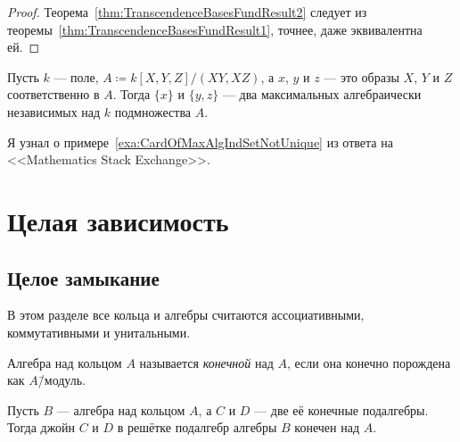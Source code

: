 \documentclass[
	extrafontsizes,
	11pt,
	hyphens,
]{memoir}
\begin{document}
\begin{proof}
Теорема~\ref{thm:TranscendenceBasesFundResult2} следует из теоремы~\ref{thm:TranscendenceBasesFundResult1}, точнее, даже эквивалентна ей.
\end{proof}

\begin{example}
Пусть \(k\) --- поле, \(A \coloneqq k[X, Y, Z]/(XY, XZ)\), а \(x\), \(y\) и \(z\) --- это образы \(X\), \(Y\) и \(Z\) соответственно в \(A\).%
\label{exa:CardOfMaxAlgIndSetNotUnique}
Тогда \(\{x\}\) и \(\{y, z\}\) --- два максимальных алгебраически независимых над \(k\) подмножества \(A\).
\end{example}

\begin{remark}
Я узнал о примере~\ref{exa:CardOfMaxAlgIndSetNotUnique} из ответа \cite{ms942910} на <<\textenglish{Mathematics Stack Exchange}>>.
\end{remark}



\chapter{Целая зависимость}


\section{Целое замыкание}

\begin{convention}
В этом разделе все кольца и алгебры считаются ассоциативными, коммутативными и унитальными.
\end{convention}


\begin{definition}
Алгебра над кольцом \(A\) называется \emph{конечной} над \(A\), если она конечно порождена как \(A\)\=/модуль.
\end{definition}

\begin{theorem}
Пусть \(B\) --- алгебра над кольцом \(A\), а \(C\) и \(D\) --- две её конечные подалгебры.%
\label{thm:JoinFinAlg}
Тогда джойн \(C\) и \(D\) в решётке подалгебр алгебры \(B\) конечен над \(A\).
\end{theorem}
\end{document}

